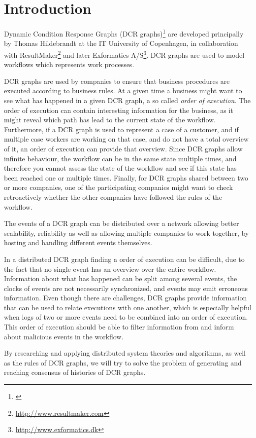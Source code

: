 \chapter{Introduction}
	Dynamic Condition Response Graphs (DCR graphs)\footnote{\cite{hildebrandt2011declarative}} are developed principally by Thomas Hildebrandt at the IT University of Copenhagen, in collaboration with ResultMaker\footnote{\url{http://www.resultmaker.com}} and later Exformatics A/S\footnote{\url{http://www.exformatics.dk}}. DCR graphs are used to model workflows which represents work processes.
	
	\newpar DCR graphs are used by companies to ensure that business procedures are executed according to business rules. At a given time a business might want to see what has happened in a given DCR graph, a so called \textit{order of execution}. The order of execution can contain interesting information for the business, as it might reveal which path has lead to the current state of the workflow. Furthermore, if a DCR graph is used to represent a case of a customer, and if multiple case workers are working on that case, and do not have a total overview of it, an order of execution can provide that overview. Since DCR graphs allow infinite behaviour, the workflow can be in the same state multiple times, and therefore you cannot assess the state of the workflow and see if this state has been reached one or multiple times. Finally, for DCR graphs shared between two or more companies, one of the participating companies might want to check retroactively whether the other companies have followed the rules of the workflow.
	
	\newpar The events of a DCR graph can be distributed over a network allowing better scalability, reliability as well as allowing multiple companies to work together, by hosting and handling different events themselves.
	
	\newpar In a distributed DCR graph finding a order of execution can be difficult, due to the fact that no single event has an overview over the entire workflow. Information about what has happened can be split among several events, the clocks of events are not necessarily synchronized, and events may emit erroneous information. Even though there are challenges, DCR graphs provide information that can be used to relate executions with one another, which is especially helpful when logs of two or more events need to be combined into an order of execution. This order of execution should be able to filter information from and inform about malicious events in the workflow.
	
	\newpar By researching and applying distributed system theories and algorithms, as well as the rules of DCR graphs, we will try to solve the problem of generating and reaching consensus of histories of DCR graphs. 
    
